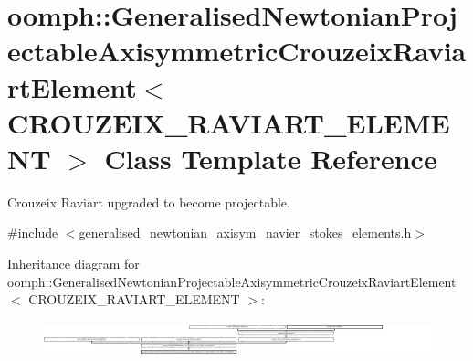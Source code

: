 \hypertarget{classoomph_1_1GeneralisedNewtonianProjectableAxisymmetricCrouzeixRaviartElement}{}\section{oomph\+:\+:Generalised\+Newtonian\+Projectable\+Axisymmetric\+Crouzeix\+Raviart\+Element$<$ C\+R\+O\+U\+Z\+E\+I\+X\+\_\+\+R\+A\+V\+I\+A\+R\+T\+\_\+\+E\+L\+E\+M\+E\+NT $>$ Class Template Reference}
\label{classoomph_1_1GeneralisedNewtonianProjectableAxisymmetricCrouzeixRaviartElement}


Crouzeix Raviart upgraded to become projectable.  




{\ttfamily \#include $<$generalised\+\_\+newtonian\+\_\+axisym\+\_\+navier\+\_\+stokes\+\_\+elements.\+h$>$}

Inheritance diagram for oomph\+:\+:Generalised\+Newtonian\+Projectable\+Axisymmetric\+Crouzeix\+Raviart\+Element$<$ C\+R\+O\+U\+Z\+E\+I\+X\+\_\+\+R\+A\+V\+I\+A\+R\+T\+\_\+\+E\+L\+E\+M\+E\+NT $>$\+:\begin{figure}[H]
\begin{center}
\leavevmode
\includegraphics[height=1.037037cm]{classoomph_1_1GeneralisedNewtonianProjectableAxisymmetricCrouzeixRaviartElement}
\end{center}
\end{figure}

